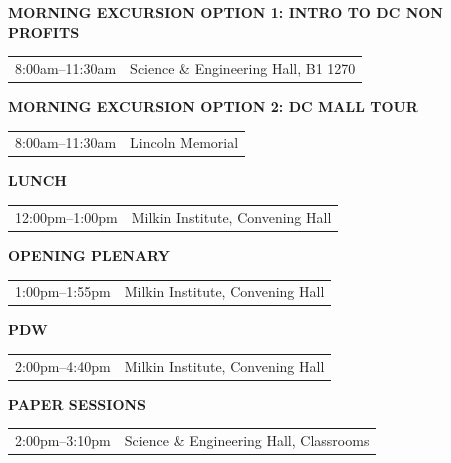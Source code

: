 \documentclass[
  10pt,
  letterpaper,
  DIV=11,
  numbers=noendperiod]{scrartcl}
\begin{document}
{\renewcommand{\arraystretch}{0.9}

\noindent\textcolor{event}{\textbf{MORNING EXCURSION OPTION 1: INTRO TO DC NON PROFITS}}

\begin{tabular}{@{}p{3.2cm}p{\dimexpr\linewidth-3.5cm}@{}}
  8:00am--11:30am & Science \& Engineering Hall, B1 1270 \\
\end{tabular}

\vspace{0.25em}

\noindent\textcolor{event}{\textbf{MORNING EXCURSION OPTION 2: DC MALL TOUR}}

\begin{tabular}{@{}p{3.2cm}p{\dimexpr\linewidth-3.5cm}@{}}
  8:00am--11:30am & Lincoln Memorial \\
\end{tabular}

\vspace{0.25em}

\noindent\textcolor{event}{\textbf{LUNCH}}

\begin{tabular}{@{}p{3.2cm}p{\dimexpr\linewidth-3.5cm}@{}}
  12:00pm--1:00pm & Milkin Institute, Convening Hall \\
\end{tabular}

\vspace{0.25em}

\noindent\textcolor{event}{\textbf{OPENING PLENARY}}

\begin{tabular}{@{}p{3.2cm}p{\dimexpr\linewidth-3.5cm}@{}}
  1:00pm--1:55pm & Milkin Institute, Convening Hall \\
\end{tabular}

\vspace{0.25em}

\noindent\textcolor{event}{\textbf{PDW}}

\begin{tabular}{@{}p{3.2cm}p{\dimexpr\linewidth-3.5cm}@{}}
  2:00pm--4:40pm & Milkin Institute, Convening Hall \\
\end{tabular}

\vspace{0.25em}

\noindent\textcolor{event}{\textbf{PAPER SESSIONS}}

\begin{tabular}{@{}p{3.2cm}p{\dimexpr\linewidth-3.5cm}@{}}
  2:00pm--3:10pm & Science \& Engineering Hall, Classrooms \\
\end{tabular}

}
\end{document}
